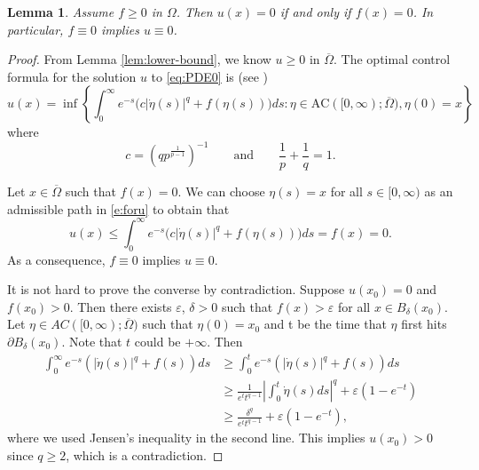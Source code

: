 \documentclass[12pt,reqno]{amsart}
\numberwithin{figure}{section}
\theoremstyle{plain}
\newtheorem{lem}[thm]{Lemma}
\theoremstyle{remark}
\numberwithin{equation}{section}
\begin{document}

\begin{lem}\label{lem:f=0} Assume $f\geq 0$ in $\Omega$. Then $u(x) = 0$ if and only if $f(x) = 0$. In particular, $f \equiv 0$ implies $u \equiv 0$.
\end{lem}
\begin{proof} From Lemma \ref{lem:lower-bound}, we know $u\geq 0$ in $\overline{\Omega}$. The optimal control formula for the solution $u$ to \eqref{eq:PDE0} is (see \cite{Bardi1997,tran_hamilton-jacobi_2021})
\begin{equation}\label{e:foru}
    u(x) = \inf \left\lbrace \int_0^\infty e^{-  s}\Big(c|\dot{\eta}(s)|^{q} +f(\eta(s))\Big)ds: \eta\in \mathrm{AC}([0,\infty);\overline{\Omega}), \eta(0) = x\right\rbrace
\end{equation}
where 
\begin{equation*}
    c = \left(qp^\frac{1}{p-1}\right)^{-1} \qquad\text{and}\qquad \frac{1}{p} + \frac{1}{q} = 1.
\end{equation*}


Let $x\in \overline{\Omega}$ such that $f(x) = 0$. We can choose $\eta(s) = x$ for all $s\in [0,\infty)$ as an admissible path in \eqref{e:foru} to obtain that
\begin{equation*}
    u(x) \leq  \int_0^\infty e^{-  s}\Big(c|\dot{\eta}(s)|^{q} +f(\eta(s))\Big)ds = f(x) =  0.
\end{equation*}
As a consequence, $f\equiv 0$ implies $u\equiv 0$. 

It is not hard to prove the converse by contradiction. Suppose $u(x_0) =0$ and $f(x_0)>0$. Then there exists $\varepsilon$, $\delta >0$ such that $f(x) > \varepsilon$ for all $x \in B_{\delta} (x_0)$. Let $\eta \in AC([0,\infty);\overline{\Omega})$ such that $\eta(0)=x_0$ and t be the time that $\eta$ first hits $\partial B_{\delta}(x_0)$. Note that $t$ could be $+\infty$. Then
\begin{equation*}
    \begin{aligned}
        \int_0^\infty e^{-s} \left(|\dot{\eta}(s)|^q +f(s )\right) ds &\geq \int_0^t e^{-s} \left(|\dot{\eta}(s)|^q +f(s )\right) ds\\
        &\geq  \frac{1}{e^t t^{q-1}}\left| \int_0^t \dot{\eta} (s) ds\right|^q+ \varepsilon \left(1-e^{-t} \right)\\
        &\geq \frac{\delta^q}{e^t t^{q-1}}+\varepsilon \left(1-e^{-t} \right),
    \end{aligned}
\end{equation*}
where we used Jensen's inequality in the second line.
This implies $u(x_0)>0$ since $q \geq 2$, which is a contradiction.
\end{proof}
\end{document}
